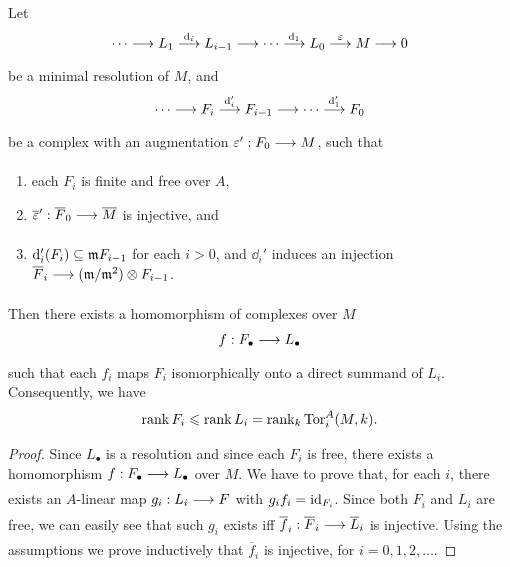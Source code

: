 \documentclass[../main]{subfiles}
\begin{document}
\begin{lemma}\label{lem:18.09} Let \[\cdots\varrightarrow{} L_{1} \varrightarrow{\dd_{i}} L_{i-1}\varrightarrow{}\cdots \varrightarrow{\dd_{1}} L_{0}\varrightarrow{\varepsilon}M \varrightarrow{} 0\] be a minimal resolution of $M$, and
\[
\cdots \varrightarrow{} F_{i} \varrightarrow{\dd_{i}'} F_{i-1} \varrightarrow{} \cdots \varrightarrow{\dd_1'} F_{0}
\]
be a complex with an augmentation $\varepsilon': F_{0} \varrightarrow{} M$, such that
\begin{enumerate}[label = \roman*)]
    \item each $F_{i}$ is finite and free over $A$,
    \item $\overline{\varepsilon}': \overline{F}_{0} \varrightarrow{} \overline{M}$ is injective, and
    \item $\mathrm{d}_{i}'(F_{i}) \subseteq \mathfrak{m} F_{i-1}$ for each $i>0$, and $\dd_{i}'$ induces an injection\newline $\overline{F}_{i} \varrightarrow{}(\ideal{m} / \ideal{m}^{2}) \otimes F_{i-1}$. 
\end{enumerate}
 Then there exists a homomorphism of complexes over $M$
\[
f: F_\bullet \varrightarrow{} L_\bullet
\]
such that each $f_{i}$ maps $F_{i}$ isomorphically onto a direct summand of $L_{i}$. Consequently, we have
\[\operatorname{rank} F_i \leqslant \operatorname{rank} L_i = \operatorname{rank}_k \operatorname{Tor}_i^A (M,k). \]
\end{lemma}
\begin{proof} Since $L_\bullet$ is a resolution and since each $F_{i}$ is free, there exists a homomorphism $f: F_\bullet \varrightarrow{} L_\bullet$ over $M$. We have to prove that, for each $i$, there exists an $A$-linear map $g_{i}: L_{i}\varrightarrow{} F$ with $g_{i} f_{i}= \operatorname{id}_{F_i}$. Since both $F_{i}$ and $L_{i}$ are free, we can easily see that such $g_{i}$ exists iff $\overline{f}_{i}: \overline{F}_{i}\varrightarrow{}\overline{L}_{i}$ is injective. Using the assumptions we prove inductively that $\overline{f}_{i}$ is injective, for $i=0,1,2, \dots$.
\end{proof}
\end{document}
